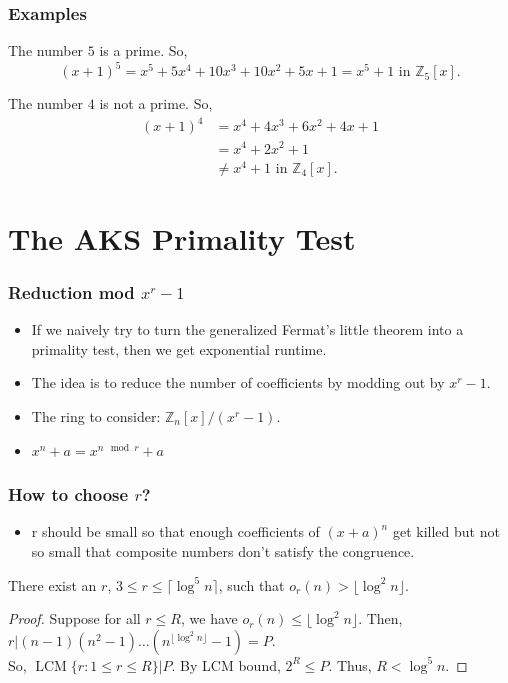 \documentclass[11pt]{beamer}
\newcommand{\ZZ}{\mathbb{Z}}
\newcommand{\LCM}{\operatorname{LCM}}
\begin{document}
\begin{frame}
  \frametitle{Examples}
  \begin{example}
    The number $5$ is a prime. So,
    \[
      (x+1)^5 = x^5 + 5x^4 + 10x^3 + 10x^2 + 5x + 1 = x^5 + 1 \text{ in }
      \ZZ_5[x].
    \]
  \end{example}
  \pause
  \begin{example}
    The number $4$ is not a prime. So,
    \begin{align*}
      (x+1)^4 & = x^4 + 4x^3 + 6x^2 + 4x + 1 \\
              & = x^4 + 2x^2 + 1 \\
              & \not= x^4 + 1 \text{ in } \ZZ_4[x].
    \end{align*}
  \end{example}
\end{frame}

\section{The AKS Primality Test}
\begin{frame}
  \frametitle{Reduction mod $x^r - 1$}
  \begin{itemize}
    \item If we naively try to turn the generalized Fermat's little theorem
      into a primality test, then we get exponential runtime.
    \item The idea is to reduce the number of coefficients by modding
      out by $x^r - 1$.
    \item The ring to consider: $\ZZ_n[x]/(x^r - 1)$.
    \item $ x^n + a = x^{n \mod r} + a $
  \end{itemize}
\end{frame}

\begin{frame}
  \frametitle{How to choose $r$?}
  \begin{itemize}
    \item r should be small so that enough coefficients of $(x + a)^n$ 
      get killed but not so small that composite numbers don't satisfy
      the congruence.
  \end{itemize}
  \begin{theorem}
    There exist an $r$, $3 \le r \le \lceil \log^5 n\rceil$, such that
    $o_r(n) > \lfloor \log^2 n\rfloor$.
  \end{theorem}
  \begin{proof}
    Suppose for all $r \le R$, we have $o_r(n) \le \lfloor \log^2 n \rfloor$.
    Then, $r | (n-1)(n^2 - 1)\dots(n^{\lfloor \log^2 n \rfloor} - 1) = P$.\\
    So, $\LCM\{r : 1 \le r \le R\} | P$.
    By LCM bound, $2^R \le P$.
    Thus, $R < \log^5 n$.
  \end{proof}
\end{frame}
\end{document}
